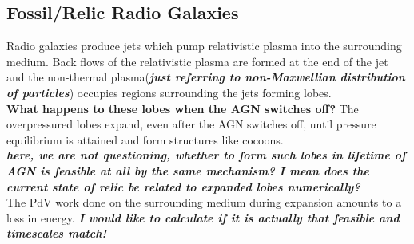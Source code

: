 \documentclass[11pt]{report}
\newcommand{\tbf}[1]{\textbf{#1}}
\newcommand{\tit}[1]{\textit{#1}}
\begin{document}
\subsection{Fossil/Relic Radio Galaxies}
Radio galaxies produce jets which pump relativistic plasma into the surrounding medium. Back flows of the relativistic plasma are formed at the end of the jet and the non-thermal plasma(\tbf{\tit{just referring to non-Maxwellian distribution of particles}}) occupies regions surrounding the jets forming lobes.\\
\textbf{What happens to these lobes when the AGN switches off?}
 The overpressured lobes expand, even after the AGN switches off, until pressure equilibrium is attained and form structures like cocoons.\\
\tbf{\tit{here, we are not questioning, whether to form such lobes in lifetime of AGN is feasible at all by the same mechanism? I mean does the current state of relic be related to expanded lobes numerically?}}\\ 
 
 The PdV work done on the surrounding medium during expansion amounts to a loss in energy. \tbf{\tit{I would like to calculate if it is actually that feasible and timescales match!}}\\
 
\end{document}
